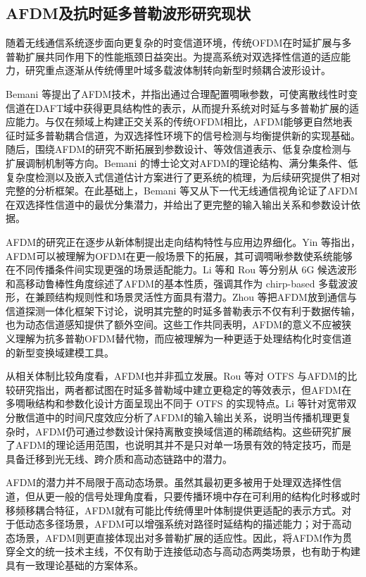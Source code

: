 \subsection{AFDM及抗时延多普勒波形研究现状}
\label{subsec:status_doppler}

随着无线通信系统逐步面向更复杂的时变信道环境，传统OFDM在时延扩展与多普勒扩展共同作用下的性能瓶颈日益突出。为提高系统对双选择性信道的适应能力，研究重点逐渐从传统傅里叶域多载波体制转向新型时频耦合波形设计。

Bemani 等提出了AFDM技术，并指出通过合理配置啁啾参数，可使离散线性时变信道在DAFT域中获得更具结构性的表示，从而提升系统对时延与多普勒扩展的适应能力\cite{bemaniAFDMFullDiversity2021}。与仅在频域上构建正交关系的传统OFDM相比，AFDM能够更自然地表征时延多普勒耦合信道，为双选择性环境下的信号检测与均衡提供新的实现基础。随后，围绕AFDM的研究不断拓展到参数设计、等效信道表示、低复杂度检测与扩展调制机制等方向。Bemani 的博士论文对AFDM的理论结构、满分集条件、低复杂度检测以及嵌入式信道估计方案进行了更系统的梳理，为后续研究提供了相对完整的分析框架\cite{bemani2023affine_thesis}。在此基础上，Bemani 等又从下一代无线通信视角论证了AFDM在双选择性信道中的最优分集潜力，并给出了更完整的输入输出关系和参数设计依据\cite{bemani2023affine_nextgen}。

AFDM的研究正在逐步从新体制提出走向结构特性与应用边界细化。Yin 等指出，AFDM可以被理解为OFDM在更一般场景下的拓展，其可调啁啾参数使系统能够在不同传播条件间实现更强的场景适配能力\cite{yin2025affine_extending}。Li 等和 Rou 等分别从 6G 候选波形和高移动鲁棒性角度综述了AFDM的基本性质，强调其作为 chirp-based 多载波波形，在兼顾结构规则性和场景灵活性方面具有潜力\cite{li2025affine_6g, rou2026affine_6g}。Zhou 等把AFDM放到通信与信道探测一体化框架下讨论，说明其完整的时延多普勒表示不仅有利于数据传输，也为动态信道感知提供了额外空间\cite{zhou2025affine_channel}。这些工作共同表明，AFDM的意义不应被狭义理解为抗多普勒OFDM替代物，而应被理解为一种更适于处理结构化时变信道的新型变换域建模工具。

从相关体制比较角度看，AFDM也并非孤立发展。Rou 等对 OTFS 与AFDM的比较研究指出，两者都试图在时延多普勒域中建立更稳定的等效表示，但AFDM在多啁啾结构和参数化设计方面呈现出不同于 OTFS 的实现特点\cite{rou2024from_otfs}。Li 等针对宽带双分散信道中的时间尺度效应分析了AFDM的输入输出关系，说明当传播机理更复杂时，AFDM仍可通过参数设计保持离散变换域信道的稀疏结构\cite{li2025affine_wideband}。这些研究扩展了AFDM的理论适用范围，也说明其并不是只对单一场景有效的特定技巧，而是具备迁移到光无线、跨介质和高动态链路中的潜力。

AFDM的潜力并不局限于高动态场景。虽然其最初更多被用于处理双选择性信道，但从更一般的信号处理角度看，只要传播环境中存在可利用的结构化时移或时移频移耦合特征，AFDM就有可能比传统傅里叶体制提供更适配的表示方式。对于低动态多径场景，AFDM可以增强系统对路径时延结构的描述能力；对于高动态场景，AFDM则更直接体现出对多普勒扩展的适应性。因此，将AFDM作为贯穿全文的统一技术主线，不仅有助于连接低动态与高动态两类场景，也有助于构建具有一致理论基础的方案体系。

